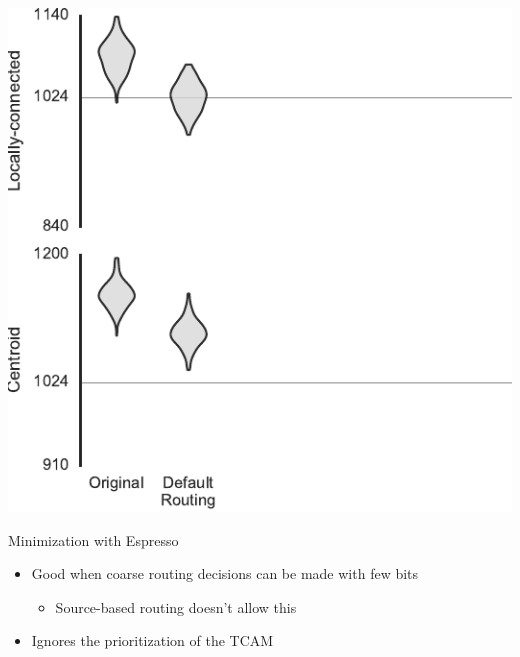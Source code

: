 \documentclass[t]{beamer}
\begin{document}
\begin{frame}[plain]{}
  \begin{center}
    \includegraphics[page=2]{../experiments/presentation_plots}
  \end{center}
\end{frame}

\begin{frame}{Minimization with Espresso}
  \begin{itemize}
    \item Good when coarse routing decisions can be made with few bits
      \begin{itemize}
        \item Source-based routing doesn't allow this
      \end{itemize}
    \item Ignores the prioritization of the TCAM
  \end{itemize}
\end{frame}
\end{document}
